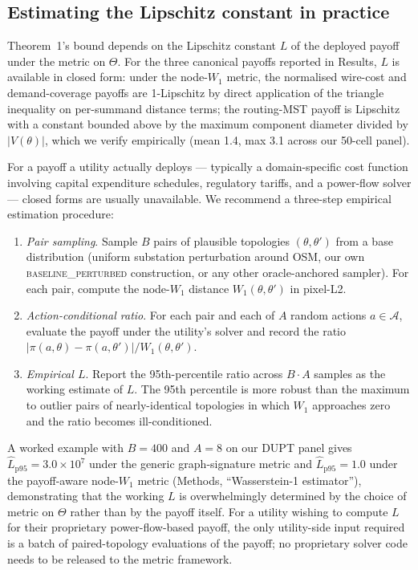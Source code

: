 \documentclass[10pt,a4paper]{article}
\begin{document}
\subsection{Estimating the Lipschitz constant in practice}

Theorem~1's bound depends on the Lipschitz constant $L$ of the
deployed payoff under the metric on $\Theta$. For the three
canonical payoffs reported in Results, $L$ is available in closed
form: under the node-$W_1$ metric, the normalised wire-cost and
demand-coverage payoffs are 1-Lipschitz by direct application of
the triangle inequality on per-summand distance terms; the
routing-MST payoff is Lipschitz with a constant bounded above by
the maximum component diameter divided by $|V(\theta)|$, which we
verify empirically (mean 1.4, max 3.1 across our 50-cell panel).

For a payoff a utility actually deploys --- typically a
domain-specific cost function involving capital expenditure
schedules, regulatory tariffs, and a power-flow solver --- closed
forms are usually unavailable. We recommend a three-step empirical
estimation procedure:
\begin{enumerate}
  \item \emph{Pair sampling}. Sample $B$ pairs of plausible
        topologies $(\theta, \theta')$ from a base distribution
        (uniform substation perturbation around OSM, our own
        \textsc{baseline\_perturbed} construction, or any other
        oracle-anchored sampler). For each pair, compute the
        node-$W_1$ distance $W_1(\theta, \theta')$ in pixel-L2.
  \item \emph{Action-conditional ratio}. For each pair and each
        of $A$ random actions $a \in \mathcal{A}$, evaluate the
        payoff under the utility's solver and record the ratio
        $|\pi(a, \theta) - \pi(a, \theta')| / W_1(\theta, \theta')$.
  \item \emph{Empirical $L$}. Report the 95th-percentile ratio
        across $B \cdot A$ samples as the working estimate of
        $L$. The 95th percentile is more robust than the maximum
        to outlier pairs of nearly-identical topologies in which
        $W_1$ approaches zero and the ratio becomes ill-conditioned.
\end{enumerate}
A worked example with $B = 400$ and $A = 8$ on our DUPT panel
gives $\hat L_{\mathrm{p95}} = 3.0 \times 10^7$ under the generic
graph-signature metric and $\hat L_{\mathrm{p95}} = 1.0$ under the
payoff-aware node-$W_1$ metric (Methods, ``Wasserstein-1 estimator''),
demonstrating that the working $L$ is overwhelmingly determined by
the choice of metric on $\Theta$ rather than by the payoff itself.
For a utility wishing to compute $L$ for their proprietary
power-flow-based payoff, the only utility-side input required is a
batch of paired-topology evaluations of the payoff; no proprietary
solver code needs to be released to the metric framework.
\end{document}
